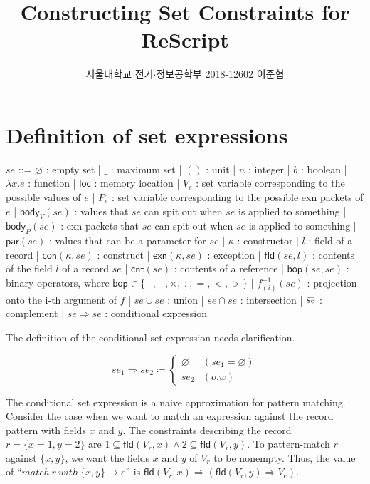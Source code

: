 \documentclass{article}
\title{Constructing Set Constraints for ReScript}
\author{서울대학교 전기$\cdot$정보공학부 2018-12602 이준협}
\date{}
\newcommand{\loverbar}[1]{\mkern 1.5mu\overline{\mkern-1.5mu#1\mkern-1.5mu}\mkern 1.5mu}
\begin{document}
\maketitle
\section{Definition of set expressions}
\begin{bnfgrammar}
  $se$ ::= $\varnothing$ : empty set
  | $\_$ : maximum set
  | $()$ : unit
  | $n$ : integer
  | $b$ : boolean
  | $\lambda x.e$ : function
  | $\mathsf{loc}$ : memory location
  | $V_{e}$ : set variable corresponding to the possible values of $e$
  | $P_{e}$ : set variable corresponding to the possible exn packets of $e$
  | $\mathsf{body}_{V}(se)$ : values that $se$ can spit out when $se$ is applied to something
  | $\mathsf{body}_{P}(se)$ : exn packets that $se$ can spit out when $se$ is applied to something
  | $\mathsf{par}(se)$ : values that can be a parameter for $se$
  | $\kappa$ : constructor
  | $l$ : field of a record
  | $\mathsf{con}(\kappa,se)$ : construct
  | $\mathsf{exn}(\kappa,se)$ : exception
  | $\mathsf{fld}(se, l)$ : contents of the field $l$ of a record $se$
  | $\mathsf{cnt}(se)$ : contents of a reference
  | $\mathsf{bop}(se, se)$ : binary operators, where $\mathsf{bop}\in\{+, -, \times, \div, =, <, >\}$
  | $f^{-1}_{(i)}(se)$ : projection onto the i-th argument of $f$
  | $se \cup se$ : union
  | $se \cap se$ : intersection
  | $\loverbar{se}$ : complement
  | $se \Rightarrow se$ : conditional expression
\end{bnfgrammar}

The definition of the conditional set expression needs clarification.

\[
  se_{1} \Rightarrow se_{2} \coloneq
  \begin{cases}
    \varnothing & (se_{1}=\varnothing)\\
    se_{2} & (o.w)
  \end{cases}
\]

The conditional set expression is a naive approximation for pattern matching. Consider the case when we want to match an expression against the record pattern with fields $x$ and $y$.
The constraints describing the record $r = \{x = 1, y = 2\}$ are $1 \subseteq \mathsf{fld}(V_{r}, x) \wedge 2 \subseteq \mathsf{fld}(V_{r}, y)$.
To pattern-match $r$ against $\{x, y\}$, we want the fields $x$ and $y$ of $V_{r}$ to be nonempty.
Thus, the value of ``$match\:r\:with\:\{x, y\}\rightarrow e$'' is $\mathsf{fld}(V_{r}, x)\Rightarrow(\mathsf{fld}(V_{r},y)\Rightarrow V_{e})$.
\end{document}
